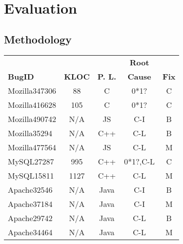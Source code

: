 \section{Evaluation}
\label{sec:experiment}

\subsection{Methodology}
\label{sec:result_meth}


\begin{table}
  \centering
  \scriptsize
  \newcommand{\Yes}[1]{\checkmark{}$_#1$}
  \newcommand{\No}[0]{-}
  \begin{tabular}{lcccc}
    \toprule
                         &      	   &                        & {\bf Root}   &          \\
   {\bf BugID}           &  {\bf KLOC}     &  {\bf P. L.}           & {\bf Cause}  & {\bf Fix}\\
   \midrule
   Mozilla347306         & 88              & C                      &  0*1?        & C     \\
   Mozilla416628         & 105             & C                      &  0*1?        & C     \\
   Mozilla490742         & N/A             & JS                     &  C-I         & B       \\
   Mozilla35294          & N/A             & C++                    &  C-L         & B        \\ 
   Mozilla477564         & N/A             & JS                     &  C-L         & M       \\
   \midrule 
   MySQL27287            & 995             & C++                    &  0*1?,C-L        & C     \\
   MySQL15811            & 1127            & C++                    &  C-L         & M \\ 
   \midrule    
   Apache32546           & N/A             & Java                   &  C-I         & B  \\
   Apache37184           & N/A             & Java                   &  C-I         & M  \\
   Apache29742           & N/A             & Java                   &  C-L         & B \\ 
   Apache34464           & N/A             & Java                   &  C-L         & M  \\

\end{tabular}
\end{table}
